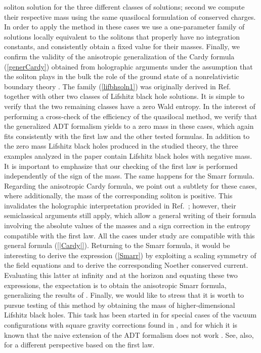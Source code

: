 \documentclass[prd,twocolumn,superscriptaddress,amsmath,amssymb,nofootinbib]{revtex4-1}
\begin{document}
soliton solution for the three different classes of solutions;
second we compute their respective mass using the same
quasilocal formulation of conserved charges. In order to apply
the method in these cases we use a one-parameter family of
solutions locally equivalent to the solitons that properly
have no integration constants, and consistently obtain a fixed
value for their masses. Finally, we confirm the validity of the
anisotropic generalization of the Cardy formula
(\ref{generCardy}) obtained from holographic arguments under
the assumption that the soliton plays in the bulk the role of
the ground state of a nonrelativistic boundary theory
\cite{Gonzalez:2011nz}. The family (\ref{lifbhsoln1}) was
originally derived in Ref.~\cite{Correa:2014ika} together with
other two classes of Lifshitz black hole solutions. It is
simple to verify that the two remaining classes have a zero
Wald entropy. In the interest of performing a cross-check of
the efficiency of the quasilocal method, we verify that
the generalized ADT formalism yields to a zero mass in these
cases, which again fits consistently with the first law and the
other tested formulas. In addition to the zero mass Lifshitz black holes produced in the studied theory, the three examples analyzed
in the paper contain Lifshitz black holes with negative mass.
It is important to emphasize that our checking of the first law
is performed independently of the sign of the mass. The same
happens for the Smarr formula. Regarding the anisotropic Cardy
formula, we point out a subtlety for these cases, where
additionally, the mass of the corresponding soliton is positive.
This invalidates the holographic interpretation provided in
Ref.~\cite{Correa:2014ika}; however, their semiclassical
arguments still apply, which allow a general writing of their
formula involving the absolute values of the masses and a sign
correction in the entropy compatible with the first law. All
the cases under study are compatible with this general formula
(\ref{|Cardy|}). Returning to the Smarr formula, it would be
interesting to derive the expression (\ref{Smarr}) by
exploiting a scaling symmetry of the field equations and to
derive the corresponding Noether conserved current. Evaluating
this latter at infinity and at the horizon and equating these
two expressions, the expectation is to obtain the anisotropic
Smarr formula, generalizing the results of
\cite{Banados:2005hm}. Finally, we would like to stress that it
is worth to pursue testing of this method by obtaining the
mass of higher-dimensional Lifshitz black holes. This task has
been started in \cite{Gim:2014nba} for special cases of the
vacuum configurations with square gravity corrections found in
\cite{AyonBeato:2010tm}, and for which it is known that the
naive extension of the ADT formalism does not work
\cite{Devecioglu:2010sf}. See, also, \cite{Fan:2014ala} for a
different perspective based on the first law.
\end{document}
